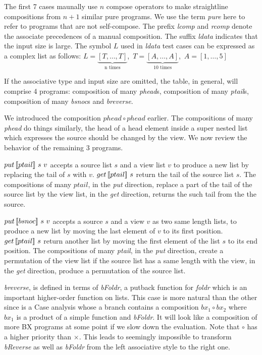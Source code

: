 The first 7 cases maunally use $n$ compose operators to make straightline compositions from $n + 1$ similar pure programs. We use the term \textit{pure} here to refer to programs that are not self-compose. The prefix \textit{lcomp} and \textit{rcomp} denote the associate precedences of a manual composition. The suffix \textit{ldata} indicates that the input size is large. The symbol $L$ used in \textit{ldata} test cases can be expressed as a complex list as follows: $L = \underbrace{[T,\ldots,T]}_{\text{n times}}$,\ $T = \underbrace{[A,\ldots,A]}_{\text{10 times}}$,\ $A = [1,\ldots,5]$

If the associative type and input size are omitted, the table, in general, will comprise 4 programs: composition of many \textit{phead}s, composition of many \textit{ptail}s, composition of many \textit{bsnoc}s and \textit{breverse}.

We introduced the composition $phead \circ phead$ earlier. The compositions of many \textit{phead} do things similarly, the head of a head element inside a super nested list which expresses the source should be changed by the view. We now review the behavior of the remaining 3 programs.

\tab $put \, [\![ptail]\!] \ s \ v$ accepts a source list $s$ and a view list $v$ to produce a new list by replacing the tail of $s$ with $v$. $get \, [\![ptail]\!] \ s$ return the tail of the source list $s$. The compositions of many $ptail$, in the \textit{put} direction, replace a part of the tail of the source list by the view list, in the \textit{get} direction, returns the such tail from the the source.

\tab $put \, [\![bsnoc]\!] \ s \ v$ accepts a source $s$ and a view $v$ as two same length lists, to produce a new list by moving the last element of $v$ to its first position. $get \, [\![ptail]\!] \ s$ return another list by moving the first element of the list $s$ to its end position. The compositions of many \textit{ptail}, in the \textit{put} direction, create a permutation of the view list if the source list has a same length with the view, in the \textit{get} direction, produce a permutation of the source list.

\tab \textit{breverse}, is defined in terms of \textit{bFoldr}, a putback function for \textit{foldr} which is an important higher-order function on lists. This case is more natural than the other since  is a Case analysis whose a branch contains a composition $bx_1 \circ bx_2$ where $bx_1$ is a product of a simple function and \textit{bFoldr}. It will look like a composition of more BX programs at some point if we slow down the evaluation. Note that $\circ$ has a higher priority than $\times$. This leads to seemingly impossible to transform \textit{bReverse} as well as \textit{bFoldr} from the left associative style to the right one.

